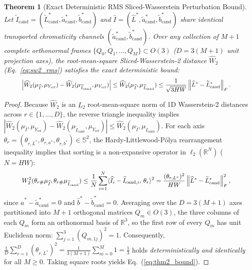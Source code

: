 \documentclass[conference,10pt]{IEEEtran}
\newtheorem{theorem}{Theorem}
\begin{document}
\begin{theorem}[Exact Deterministic RMS Sliced-Wasserstein Perturbation Bound]
\label{thm:sw2_bound}
Let $\widetilde{I}_{\text{cand}} = (\widetilde{L}^*_{\text{cand}}, \widetilde{a}^*_{\text{cand}}, \widetilde{b}^*_{\text{cand}})$ and $\widehat{I} = (\widehat{L}^*, \widetilde{a}^*_{\text{cand}}, \widetilde{b}^*_{\text{cand}})$ share identical transported chromaticity channels $(\widetilde{a}^*_{\text{cand}}, \widetilde{b}^*_{\text{cand}})$. Over any collection of $M+1$ complete orthonormal frames $\{Q_0, Q_1, \dots, Q_M\} \subset O(3)$ ($D = 3(M+1)$ unit projection axes), the root-mean-square Sliced-Wasserstein-2 distance $\widehat{W}_2$ (Eq.~\ref{eq:sw2_rms}) satisfies the exact deterministic bound:
\begin{equation}
\label{eq:thm2_bound}
\resizebox{0.89\columnwidth}{!}{$\displaystyle
\left|\widehat{W}_2(\mu_{\widehat{I}}, \mu_{Y_{\text{ref}}}) - \widehat{W}_2(\mu_{\widetilde{I}_{\text{cand}}}, \mu_{Y_{\text{ref}}})\right|
\le \widehat{W}_2(\mu_{\widehat{I}}, \mu_{\widetilde{I}_{\text{cand}}})
\le \frac{1}{\sqrt{3HW}} \left\|\widehat{L}^* - \widetilde{L}^*_{\text{cand}}\right\|_F.
$}
\end{equation}
\end{theorem}
\begin{proof}
Because $\widehat{W}_2$ is an $L_2$ root-mean-square norm of 1D Wasserstein-2 distances across $r \in \{1, \dots, D\}$, the reverse triangle inequality implies $|\widehat{W}_2(\mu_{\widehat{I}}, \mu_{Y_{\text{ref}}}) - \widehat{W}_2(\mu_{\widetilde{I}_{\text{cand}}}, \mu_{Y_{\text{ref}}})| \le \widehat{W}_2(\mu_{\widehat{I}}, \mu_{\widetilde{I}_{\text{cand}}})$. For each axis $\theta_r = (\theta_{r,L^*}, \theta_{r,a^*}, \theta_{r,b^*}) \in \mathbb{S}^2$, the Hardy-Littlewood-P\'{o}lya rearrangement inequality implies that sorting is a non-expansive operator in $\ell_2(\mathbb{R}^N)$ ($N = HW$):
\begin{equation}
\resizebox{0.89\columnwidth}{!}{$\displaystyle
W_2^2(\theta_{r\#}\mu_{\widehat{I}}, \theta_{r\#}\mu_{\widetilde{I}_{\text{cand}}})
\le \frac{1}{N} \sum_{i=1}^N \langle \widehat{I}_i - \widetilde{I}_{\text{cand},i},\, \theta_r \rangle^2
= \frac{(\theta_{r,L^*})^2}{HW} \left\|\widehat{L}^* - \widetilde{L}^*_{\text{cand}}\right\|_F^2,
$}
\end{equation}
since $\widehat{a}^* - \widetilde{a}^*_{\text{cand}} = 0$ and $\widehat{b}^* - \widetilde{b}^*_{\text{cand}} = 0$. Averaging over the $D = 3(M+1)$ axes partitioned into $M+1$ orthogonal matrices $Q_m \in O(3)$, the three columns of each $Q_m$ form an orthonormal basis of $\mathbb{R}^3$, so the first row of every $Q_m$ has unit Euclidean norm: $\sum_{j=1}^3 (Q_{m,1j})^2 = 1$. Consequently, $\frac{1}{D}\sum_{r=1}^D (\theta_{r,L^*})^2 = \frac{1}{3(M+1)}\sum_{m=0}^M 1 = \frac{1}{3}$ holds \emph{deterministically and identically} for all $M \ge 0$. Taking square roots yields Eq.~(\ref{eq:thm2_bound}).
\end{proof}
\end{document}
